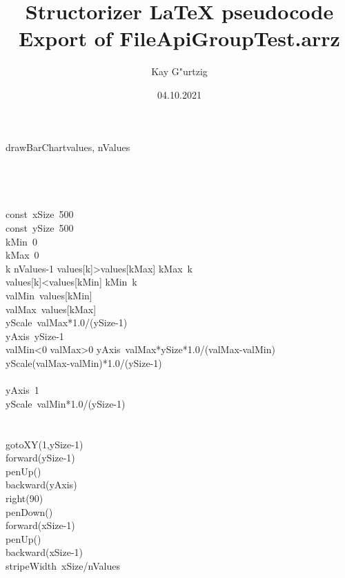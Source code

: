 \documentclass[a4paper,10pt]{article}
\title{Structorizer LaTeX pseudocode Export of FileApiGroupTest.arrz}
\author{Kay G"urtzig}
\date{04.10.2021}
\begin{document}
\begin{pseudocode}{drawBarChart}{values, nValues }
\label{drawBarChart}
\\
\\
\\
\\
  \\
  const\ xSize\gets\ 500\\
  const\ ySize\gets\ 500\\
  kMin\gets\ 0\\
  kMax\gets\ 0\\
  \FOR k  \TO nValues-1  \DO
    \IF values[k]>values[kMax] \THEN
      kMax\gets\ k\\
    \ELSE
      \IF values[k]<values[kMin] \THEN
        kMin\gets\ k\\
  valMin\gets\ values[kMin]\\
  valMax\gets\ values[kMax]\\
  yScale\gets\ valMax*1.0/(ySize-1)\\
  yAxis\gets\ ySize-1\\
  \IF valMin<0 \THEN
    \IF valMax>0 \THEN
    \BEGIN
      yAxis\gets\ valMax*ySize*1.0/(valMax-valMin)\\
      yScale\gets(valMax-valMin)*1.0/(ySize-1)\\
    \END\\
    \ELSE
    \BEGIN
      yAxis\gets\ 1\\
      yScale\gets\ valMin*1.0/(ySize-1)\\
    \END\\
  \\
  gotoXY(1,ySize-1)\\
  forward(ySize-1)\\
  penUp()\\
  backward(yAxis)\\
  right(90)\\
  penDown()\\
  forward(xSize-1)\\
  penUp()\\
  backward(xSize-1)\\
  stripeWidth\gets\ xSize/nValues\\

\end{pseudocode}
\end{document}
